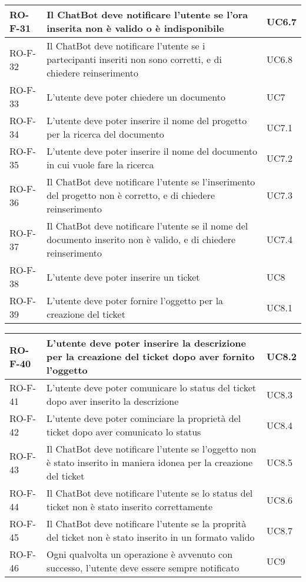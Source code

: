 \begin{center}
\begin{tabular}{ | m{8em} | m{18em} | m{12em} | }
\hline
RO-F-31&Il ChatBot deve notificare l’utente se l’ora inserita non è valido o è indisponibile &UC6.7 \\
\hline
RO-F-32&Il ChatBot deve notificare l’utente se i partecipanti inseriti non sono corretti, e di chiedere reinserimento &UC6.8 \\
\hline
RO-F-33&L’utente deve poter chiedere un documento &UC7 \\
\hline
RO-F-34&L’utente deve poter inserire il nome del progetto per la ricerca del documento &UC7.1 \\
\hline
RO-F-35&L’utente deve poter inserire il nome del documento in cui vuole fare la ricerca &UC7.2 \\
\hline
RO-F-36&Il ChatBot deve notificare l’utente se l’inserimento del progetto non è corretto, e di chiedere reinserimento &UC7.3\\
\hline
RO-F-37&Il ChatBot deve notificare l’utente se il nome del documento inserito non è valido, e di chiedere reinserimento &UC7.4 \\
\hline
RO-F-38&L’utente deve poter inserire un ticket &UC8 \\
\hline
RO-F-39&L’utente deve poter fornire l’oggetto per la creazione del ticket &UC8.1 \\
\hline
\end{tabular}
\newpage
\begin{tabular}{ | m{8em} | m{18em} | m{12em} | }
\hline
RO-F-40&L’utente deve poter inserire la descrizione per la creazione del ticket dopo aver fornito l’oggetto &UC8.2 \\
\hline
RO-F-41&L’utente deve poter comunicare lo status del ticket dopo aver inserito la descrizione &UC8.3 \\
\hline
RO-F-42&L’utente deve poter cominciare la proprietà del ticket dopo aver comunicato lo status &UC8.4 \\
\hline
RO-F-43&Il ChatBot deve notificare l’utente se l’oggetto non è stato inserito in maniera idonea per la creazione del ticket  &UC8.5 \\
\hline
RO-F-44&Il ChatBot deve notificare l’utente se lo status del ticket non è stato inserito correttamente  &UC8.6 \\
\hline
RO-F-45&Il ChatBot deve notificare l’utente se la proprità del ticket non è stato inserito in un formato valido &UC8.7 \\
\hline
RO-F-46&Ogni qualvolta un operazione è avvenuto con successo, l’utente deve essere sempre notificato &UC9 \\
\hline

\end{tabular}
\end{center}
